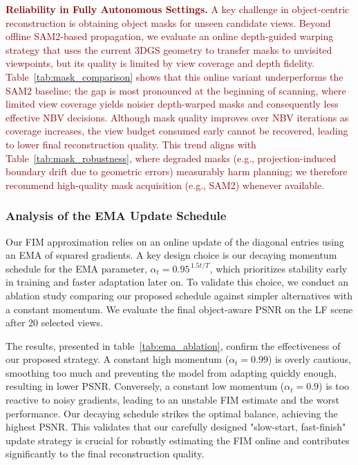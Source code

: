 \documentclass{egpubl}
\newcommand{\rev}[1]{\textcolor{darkred}{#1}}
\begin{document}
\rev{
\textbf{Reliability in Fully Autonomous Settings.}
A key challenge in object-centric reconstruction is obtaining object masks for unseen candidate views. Beyond offline SAM2-based propagation, we evaluate an online depth-guided warping strategy that uses the current 3DGS geometry to transfer masks to unvisited viewpoints, but its quality is limited by view coverage and depth fidelity. Table~\ref{tab:mask_comparison} shows that this online variant underperforms the SAM2 baseline; the gap is most pronounced at the beginning of scanning, where limited view coverage yields noisier depth-warped masks and consequently less effective NBV decisions. Although mask quality improves over NBV iterations as coverage increases, the view budget consumed early cannot be recovered, leading to lower final reconstruction quality. This trend aligns with Table~\ref{tab:mask_robustness}, where degraded masks (e.g., projection-induced boundary drift due to geometric errors) measurably harm planning; we therefore recommend high-quality mask acquisition (e.g., SAM2) whenever available.
}

\subsubsection*{Analysis of the EMA Update Schedule} 
Our FIM approximation relies on an online update of the diagonal entries using an EMA of squared gradients. A key design choice is our decaying momentum schedule for the EMA parameter, $\alpha_t = 0.95^{\,1.5t/T}$, which prioritizes stability early in training and faster adaptation later on. To validate this choice, we conduct an ablation study comparing our proposed schedule against simpler alternatives with a constant momentum. We evaluate the final object-aware PSNR on the LF scene after 20 selected views.



The results, presented in table~\ref{tab:ema_ablation}, confirm the effectiveness of our proposed strategy. A constant high momentum ($\alpha_t=0.99$) is overly cautious, smoothing too much and preventing the model from adapting quickly enough, resulting in lower PSNR. Conversely, a constant low momentum ($\alpha_t=0.9$) is too reactive to noisy gradients, leading to an unstable FIM estimate and the worst performance. Our decaying schedule strikes the optimal balance, achieving the highest PSNR. This validates that our carefully designed "slow-start, fast-finish" update strategy is crucial for robustly estimating the FIM online and contributes significantly to the final reconstruction quality.
\vspace{-2mm}
\end{document}
